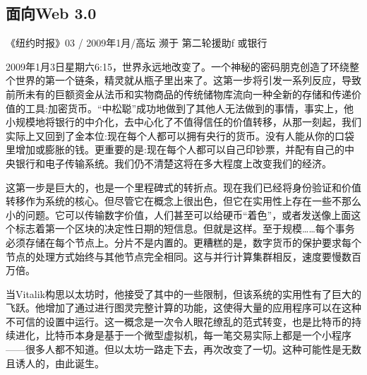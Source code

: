 \subsection{面向Web 3.0 \statusgreen}\label{sec:towards-web3}


\begin{centerverbatim}
《纽约时报》03 /
2009年1月/高坛
濒于
第二轮援助f
或银行
\end{centerverbatim}

2009年1月3日星期六6:15，世界永远地改变了。一个神秘的密码朋克创造了环绕整个世界的第一个链条，精灵就从瓶子里出来了。这第一步将引发一系列反应，导致前所未有的巨额资金从法币和实物商品的传统储物库流向一种全新的存储和传递价值的工具:加密货币。“中松聪”成功地做到了其他人无法做到的事情，事实上，他小规模地将银行的中介化，去中心化了不值得信任的价值转移，从那一刻起，我们实际上又回到了金本位:现在每个人都可以拥有央行的货币。没有人能从你的口袋里增加或膨胀的钱。更重要的是:现在每个人都可以自己印钞票，并配有自己的中央银行和电子传输系统。我们仍不清楚这将在多大程度上改变我们的经济。

这第一步是巨大的，也是一个里程碑式的转折点。现在我们已经将身份验证和价值转移作为系统的核心。但尽管它在概念上很出色，但它在实用性上存在一些不那么小的问题。它可以传输数字价值，人们甚至可以给硬币“着色”，或者发送像上面这个标志着第一个区块的决定性日期的短信息。但就是这样。至于规模……每个事务必须存储在每个节点上。分片不是内置的。更糟糕的是，数字货币的保护要求每个节点的处理方式始终与其他节点完全相同。这与并行计算集群相反，速度要慢数百万倍。

当Vitalik构思以太坊时，他接受了其中的一些限制，但该系统的实用性有了巨大的飞跃。他增加了通过进行图灵完整计算的功能，这使得大量的应用程序可以在这种不可信的设置中运行。这一概念是一次令人眼花缭乱的范式转变，也是比特币的持续进化，比特币本身是基于一个微型虚拟机，每一笔交易实际上都是一个小程序——很多人都不知道。但以太坊一路走下去，再次改变了一切。这种可能性是无数且诱人的，由此诞生。

